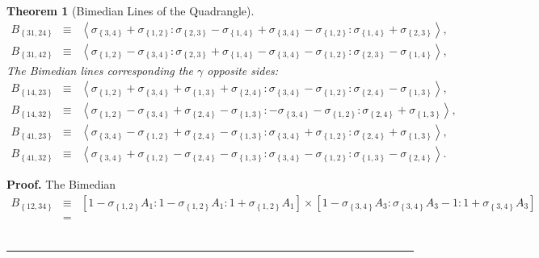 \documentclass{unswthesis}
\newtheorem{theorem}{Theorem}
\newenvironment{proof}[1][Proof]{\noindent\textbf{#1.} }{\ \rule{0.5em}{0.5em}}
\begin{document}
\begin{theorem}[Bimedian Lines of the Quadrangle]
\begin{eqnarray*}
B_{\left\{ 31,24\right\} } &\equiv &\left\langle \sigma _{\left\{
3,4\right\} }+\sigma _{\left\{ 1,2\right\} }:\sigma _{\left\{ 2,3\right\}
}-\sigma _{\left\{ 1,4\right\} }+\sigma _{\left\{ 3,4\right\} }-\sigma
_{\left\{ 1,2\right\} }:\sigma _{\left\{ 1,4\right\} }+\sigma _{\left\{
2,3\right\} }\right\rangle , \\
B_{\left\{ 31,42\right\} } &\equiv &\left\langle \sigma _{\left\{
1,2\right\} }-\sigma _{\left\{ 3,4\right\} }:\sigma _{\left\{ 2,3\right\}
}+\sigma _{\left\{ 1,4\right\} }-\sigma _{\left\{ 3,4\right\} }-\sigma
_{\left\{ 1,2\right\} }:\sigma _{\left\{ 2,3\right\} }-\sigma _{\left\{
1,4\right\} }\right\rangle ,
\end{eqnarray*}%
The Bimedian lines corresponding the $\gamma $ opposite sides:%
\begin{eqnarray*}
B_{\left\{ 14,23\right\} } &\equiv &\left\langle \sigma _{\left\{
1,2\right\} }+\sigma _{\left\{ 3,4\right\} }+\sigma _{\left\{ 1,3\right\}
}+\sigma _{\left\{ 2,4\right\} }:\sigma _{\left\{ 3,4\right\} }-\sigma
_{\left\{ 1,2\right\} }:\sigma _{\left\{ 2,4\right\} }-\sigma _{\left\{
1,3\right\} }\right\rangle , \\
B_{\left\{ 14,32\right\} } &\equiv &\left\langle \sigma _{\left\{
1,2\right\} }-\sigma _{\left\{ 3,4\right\} }+\sigma _{\left\{ 2,4\right\}
}-\sigma _{\left\{ 1,3\right\} }:-\sigma _{\left\{ 3,4\right\} }-\sigma
_{\left\{ 1,2\right\} }:\sigma _{\left\{ 2,4\right\} }+\sigma _{\left\{
1,3\right\} }\right\rangle , \\
B_{\left\{ 41,23\right\} } &\equiv &\left\langle \sigma _{\left\{
3,4\right\} }-\sigma _{\left\{ 1,2\right\} }+\sigma _{\left\{ 2,4\right\}
}-\sigma _{\left\{ 1,3\right\} }:\sigma _{\left\{ 3,4\right\} }+\sigma
_{\left\{ 1,2\right\} }:\sigma _{\left\{ 2,4\right\} }+\sigma _{\left\{
1,3\right\} }\right\rangle , \\
B_{\left\{ 41,32\right\} } &\equiv &\left\langle \sigma _{\left\{
3,4\right\} }+\sigma _{\left\{ 1,2\right\} }-\sigma _{\left\{ 2,4\right\}
}-\sigma _{\left\{ 1,3\right\} }:\sigma _{\left\{ 3,4\right\} }-\sigma
_{\left\{ 1,2\right\} }:\sigma _{\left\{ 1,3\right\} }-\sigma _{\left\{
2,4\right\} }\right\rangle .
\end{eqnarray*}
\end{theorem}

\begin{proof}
The Bimedian 
\begin{eqnarray*}
B_{\left\{ 12,34\right\} } &\equiv &\left[ 1-\sigma _{\left\{ 1,2\right\}
}A_{1}:1-\sigma _{\left\{ 1,2\right\} }A_{1}:1+\sigma _{\left\{ 1,2\right\}
}A_{1}\right] \times \left[ 1-\sigma _{\left\{ 3,4\right\} }A_{3}:\sigma
_{\left\{ 3,4\right\} }A_{3}-1:1+\sigma _{\left\{ 3,4\right\} }A_{3}\right]
\\
&=&
\end{eqnarray*}
\end{proof}
\end{document}
